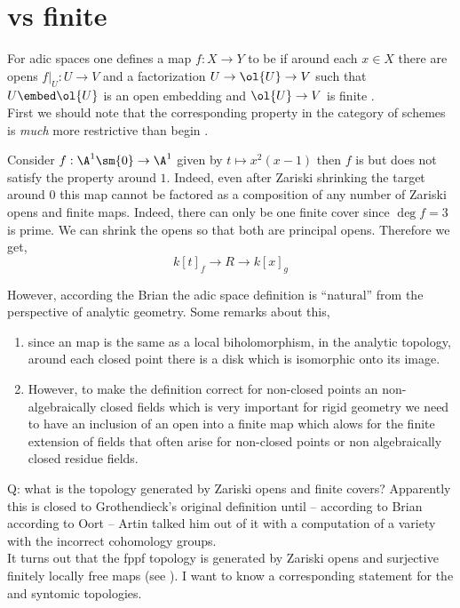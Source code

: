 \documentclass[12pt]{article}
\begin{document}
\section{\etale vs finite \etale}

For adic spaces one defines a map $f : X \to Y$ to be \etale if around each $x \in X$ there are opens $f|_U : U \to V$ and a factorization $U \to \ol{U} \to V$ such that $U \embed \ol{U}$ is an open embedding and $\ol{U} \to V$ is finite \etale.
\bigskip\\
First we should note that the corresponding property in the category of schemes is \textit{much} more restrictive than begin \etale.

\begin{example}
Consider $f : \A^1 \sm \{ 0 \} \to \A^1$ given by $t \mapsto x^2 (x - 1)$ then $f$ is \etale but does not satisfy the property around $1$. Indeed, even after Zariski shrinking the target around $0$ this map cannot be factored as a composition of any number of Zariski opens and finite \etale maps. Indeed, there can only be one finite \etale cover since $\deg{f} = 3$ is prime. We can shrink the opens so that both are principal opens. Therefore we get,
\[ k[t]_{f} \to R \to k[x]_{g} \]
\end{example}


However, according the Brian the adic space definition is ``natural'' from the perspective of analytic geometry. Some remarks about this,

\begin{enumerate}
\item since an \etale map is the same as a local biholomorphism, in the analytic topology, around each closed point there is a disk which is isomorphic onto its image. 
\item However, to make the definition correct for non-closed points an non-algebraically closed fields which is very important for rigid geometry we need to have an inclusion of an open into a finite \etale map which alows for the finite extension of fields that often arise for non-closed points or non algebraically closed residue fields.
\end{enumerate}

Q: what is the topology generated by Zariski opens and finite \etale covers? Apparently this is closed to Grothendieck's original definition until -- according to Brian according to Oort -- Artin talked him out of it with a computation of a variety with the incorrect cohomology groups. 
\bigskip\\
It turns out that the fppf topology is generated by Zariski opens and surjective finitely locally free maps (see ). I want to know a corresponding statement for the \etale and syntomic topologies. 
\end{document}
